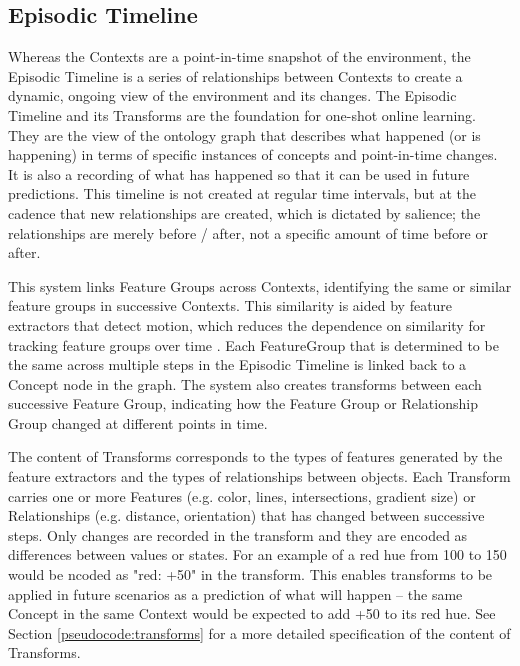 \documentclass{article}
\begin{document}
\subsection{Episodic Timeline}\label{sec:episodic-timeline}
Whereas the Contexts are a point-in-time snapshot of the environment, the Episodic Timeline is a series of relationships between Contexts to create a dynamic, ongoing view of the environment and its changes. The Episodic Timeline and its Transforms are the foundation for one-shot online learning. They are the view of the ontology graph that describes what happened (or is happening) in terms of specific instances of concepts and point-in-time changes. It is also a recording of what has happened so that it can be used in future predictions. This timeline is not created at regular time intervals, but at the cadence that new relationships are created, which is dictated by salience; the relationships are merely before / after, not a specific amount of time before or after.

This system links Feature Groups across Contexts, identifying the same or similar feature groups in successive Contexts. This similarity is aided by feature extractors that detect motion, which reduces the dependence on similarity for tracking feature groups over time \citep{kalal_tracking-learning-detection_2012}. Each FeatureGroup that is determined to be the same across multiple steps in the Episodic Timeline is linked back to a Concept node in the graph. The system also creates transforms between each successive Feature Group, indicating how the Feature Group or Relationship Group changed at different points in time. 

The content of Transforms corresponds to the types of features generated by the feature extractors and the types of relationships between objects. Each Transform carries one or more Features (e.g. color, lines, intersections, gradient size) or Relationships (e.g. distance, orientation) that has changed between successive steps. Only changes are recorded in the transform and they are encoded as differences between values or states. For an example of a red hue from 100 to 150 would be ncoded as "red: +50" in the transform. This enables transforms to be applied in future scenarios as a prediction of what will happen -- the same Concept in the same Context would be expected to add +50 to its red hue. See Section \ref{pseudocode:transforms} for a more detailed specification of the content of Transforms.
\end{document}
